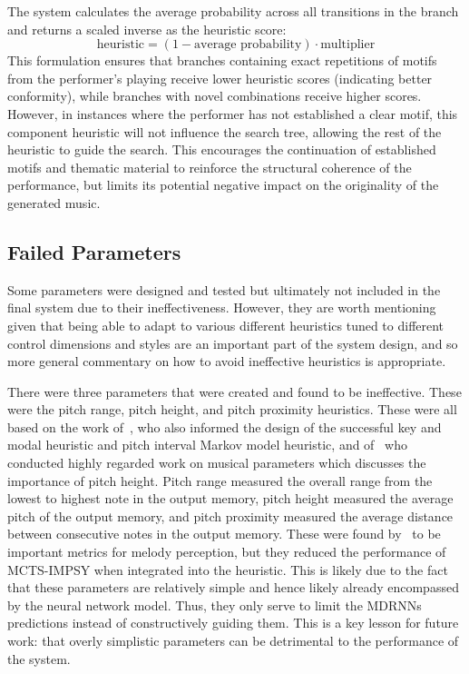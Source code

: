 The system calculates the average probability across all transitions in the branch and returns a scaled inverse as the heuristic score:
\begin{equation}
    \text{heuristic} = (1 - \text{average probability}) \cdot \text{multiplier}
\end{equation}
This formulation ensures that branches containing exact repetitions of motifs from the performer's playing receive lower heuristic scores (indicating better conformity), while branches with novel combinations receive higher scores. However, in instances where the performer has not established a clear motif, this component heuristic will not influence the search tree, allowing the rest of the heuristic to guide the search. This encourages the continuation of established motifs and thematic material to reinforce the structural coherence of the performance, but limits its potential negative impact on the originality of the generated music.

\subsection{Failed Parameters}

Some parameters were designed and tested but ultimately not included in the final system due to their ineffectiveness. However, they are worth mentioning given that being able to adapt to various different heuristics tuned to different control dimensions and styles are an important part of the system design, and so more general commentary on how to avoid ineffective heuristics is appropriate.

There were three parameters that were created and found to be ineffective. These were the pitch range, pitch height, and pitch proximity heuristics. These were all based on the work of~\cite{Temperley2008MelodyPerception}, who also informed the design of the successful key and modal heuristic and pitch interval Markov model heuristic, and of~\cite{Eitan2006MusicParameters} who conducted highly regarded work on musical parameters which discusses the importance of pitch height. Pitch range measured the overall range from the lowest to highest note in the output memory, pitch height measured the average pitch of the output memory, and pitch proximity measured the average distance between consecutive notes in the output memory. These were found by~\cite{Temperley2008MelodyPerception} to be important metrics for melody perception, but they reduced the performance of MCTS-IMPSY when integrated into the heuristic. This is likely due to the fact that these parameters are relatively simple and hence likely already encompassed by the neural network model. Thus, they only serve to limit the MDRNNs predictions instead of constructively guiding them. This is a key lesson for future work: that overly simplistic parameters can be detrimental to the performance of the system.

